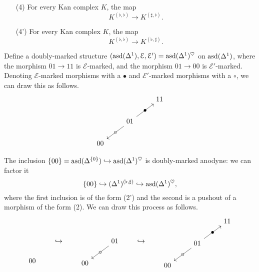 \documentclass[main.tex]{subfiles}
\begin{document}
\begin{definition}
\begin{enumerate}
    \item[(4)] For every Kan complex $K$, the map
      \begin{equation*}
        K^{(\flat, \flat)} \to K^{(\sharp, \flat)}.
      \end{equation*}

    \item[(4')] For every Kan complex $K$, the map
      \begin{equation*}
        K^{(\flat, \flat)} \to K^{(\flat, \sharp)}.
      \end{equation*}
  \end{enumerate}
\end{definition}

\begin{example}
  \label{eg:bimarking_on_asd_delta1}
  Define a doubly-marked structure $(\mathrm{asd}(\Delta^{1}), \mathcal{E}, \mathcal{E}') = \mathrm{asd}(\Delta^{1})^{\heartsuit}$ on $\mathrm{asd}(\Delta^{1})$, where the morphism $01 \to 11$ is $\mathcal{E}$-marked, and the morphism $01 \to 00$ is $\mathcal{E}'$-marked. Denoting $\mathcal{E}$-marked morphisms with a $\bullet$ and $\mathcal{E}'$-marked morphisms with a $\circ$, we can draw this as follows.
  \begin{equation*}
    \begin{tikzcd}
      && 11
      \\
      & 01
      \arrow[ur, "\bullet" marking]
      \arrow[dl, "\circ" marking]
      \\
      00
    \end{tikzcd}
  \end{equation*}

  The inclusion $\{00\} = \mathrm{asd}(\Delta^{\{0\}}) \hookrightarrow \mathrm{asd}(\Delta^{1})^{\heartsuit}$ is doubly-marked anodyne: we can factor it
  \begin{equation*}
    \{00\} \hookrightarrow (\Delta^{1})^{(\flat, \sharp)} \hookrightarrow \mathrm{asd}(\Delta^{1})^{\heartsuit},
  \end{equation*}
  where the first inclusion is of the form (2') and the second is a pushout of a morphism of the form (2). We can draw this process as follows.
  \begin{equation*}
    \begin{tikzcd}
      \
      \\
      \
      \\
      00
    \end{tikzcd}
    \qquad\hookrightarrow\qquad
    \begin{tikzcd}
      & \
      \\
      & 01
      \arrow[dl, "\circ" marking]
      \\
      00
    \end{tikzcd}
    \qquad\hookrightarrow\qquad
    \begin{tikzcd}
      && 11
      \\
      & 01
      \arrow[ur, "\bullet" marking]
      \arrow[dl, "\circ" marking]
      \\
      00
    \end{tikzcd}
  \end{equation*}
\end{example}
\end{document}
